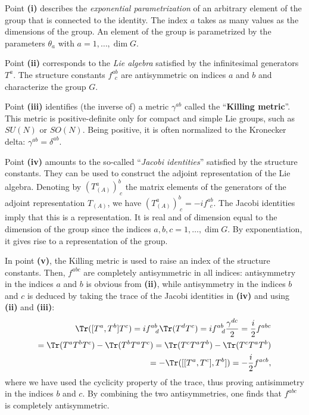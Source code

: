 Point \textbf{(i)} describes the \textit{exponential parametrization} of an arbitrary element of the group that is connected to the identity. The index $a$ takes as many values as the dimensions of the group. An element of the group is parametrized by the parameters $\theta_a$ with $a = 1, \dots, \dim G$.

Point \textbf{(ii)} corresponds to the \textit{Lie algebra} satisfied by the infinitesimal generators $T^a$. The structure constants $f^{ab}_{\ \ c}$ are antisymmetric on indices $a$ and $b$ and characterize the group $G$.

Point \textbf{(iii)} identifies (the inverse of) a metric $\gamma^{ab}$ called the ``\textbf{Killing metric}''. This metric is positive-definite only for compact and simple Lie groups, such as $SU(N)$ or $SO(N)$. Being positive, it is often normalized to the Kronecker delta: $\gamma^{ab} = \delta^{ab}$.

Point \textbf{(iv)} amounts to the so-called ``\textit{Jacobi identities}'' satisfied by the structure constants. They can be used to construct the adjoint representation of the Lie algebra. Denoting by $(T_{(A)}^a)^b_{\ c}$ the matrix elements of the generators of the adjoint representation $T_{(A)}$, we have $(T_{(A)}^a)^b_{\ c} = -i f^{ab}_{\ \ c}$. The Jacobi identities imply that this is a representation. It is real and of dimension equal to the dimension of the group since the indices $a, b, c = 1, \dots, \dim G$. By exponentiation, it gives rise to a representation of the group.

In point \textbf{(v)}, the Killing metric is used to raise an index of the structure constants. Then, $f^{abc}$ are completely antisymmetric in all indices: antisymmetry in the indices $a$ and $b$ is obvious from \textbf{(ii)}, while antisymmetry in the indices $b$ and $c$ is deduced by taking the trace of the Jacobi identities in \textbf{(iv)} and using \textbf{(ii)} and \textbf{(iii)}:
\[
    \begin{aligned}
        \Tr([T^a, T^b] T^c) = i f^{ab}_{\ \ d} \Tr(T^d T^c) = i f^{ab}_{\ \ d} \frac{\gamma^{dc}}{2} = \frac{i}{2} f^{abc} \\
        = \Tr(T^a T^b T^c) -\Tr(T^b T^a T^c) = \Tr(T^c T^a T^b) - \Tr(T^c T^a T^b)                                         \\
        = -\Tr([[T^a, T^c], T^b]) = -\frac{i}{2} f^{acb},
    \end{aligned}
\]
where we have used the cyclicity property of the trace, thus proving antisimmetry in the indices $b$ and $c$. By combining the two antisymmetries, one finds that $f^{abc}$ is completely antisymmetric.

